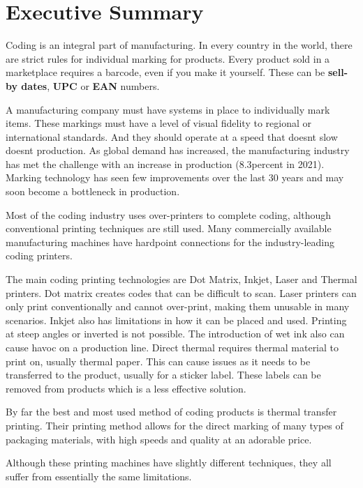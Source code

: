 \chapter*{Executive Summary}
\pagestyle{fancy}

Coding is an integral part of manufacturing. In every country in the world, there are strict rules for individual marking for products. Every product sold in a marketplace requires a barcode, even if you make it yourself. These can be \textbf{sell-by dates}, \textbf{UPC} or \textbf{EAN} numbers.


\bigskip
A  manufacturing company must have systems in place to individually mark items. These markings must have a level of visual fidelity to regional or international standards. And they should operate at a speed that doesnt slow doesnt production. As global demand has increased, the manufacturing industry has met the challenge with an increase in production (8.3percent in 2021). Marking technology has seen few improvements over the last 30 years and may soon become a bottleneck in production.

\bigskip
Most of the coding industry uses over-printers to complete coding, although conventional printing techniques are still used. Many commercially available manufacturing machines have hardpoint connections for the industry-leading coding printers. 

\bigskip
The main coding printing technologies are Dot Matrix, Inkjet, Laser and Thermal printers. Dot matrix creates codes that can be difficult to scan. Laser printers can only print conventionally and cannot over-print, making them unusable in many scenarios. Inkjet also has limitations in how it can be placed and used. Printing at steep angles or inverted is not possible. The introduction of wet ink also can cause havoc on a production line. Direct thermal requires thermal material to print on, usually thermal paper. This can cause issues as it needs to be transferred to the product, usually for a sticker label. These labels can be removed from products which is a less effective solution. 

\bigskip
By far the best and most used method of coding products is thermal transfer printing. Their printing method allows for the direct marking of many types of packaging materials, with high speeds and quality at an adorable price.

\bigskip
Although these printing machines have slightly different techniques, they all suffer from essentially the same limitations. 

